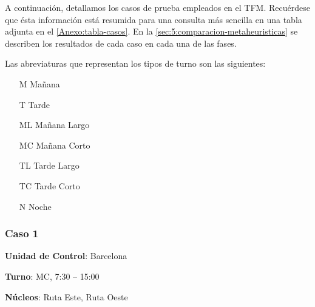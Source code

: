 

A continuación, detallamos los casos de prueba empleados en el TFM. Recuérdese que ésta información está resumida para una consulta más sencilla en una tabla adjunta en el \autoref{Anexo:tabla-casos}. En la \autoref{sec:5:comparacion-metaheuristicas} se describen los resultados de cada caso en cada una de las fases.

Las abreviaturas que representan los tipos de turno son las siguientes:

\begin{enumerate}[align=left]
	\item[M] Mañana
	\item[T] Tarde 
	\item[ML] Mañana Largo
	\item[MC] Mañana Corto
	\item[TL] Tarde Largo
	\item[TC] Tarde Corto
	\item[N] Noche
\end{enumerate}

\subsubsection{Caso 1}

\textbf{Unidad de Control}: Barcelona

\textbf{Turno}: MC, 7:30 -- 15:00

\textbf{Núcleos}: Ruta Este, Ruta Oeste

